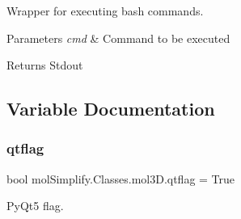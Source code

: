 Wrapper for executing bash commands. 


\begin{DoxyParams}{Parameters}
{\em cmd} & Command to be executed \\
\hline
\end{DoxyParams}
\begin{DoxyReturn}{Returns}
Stdout 
\end{DoxyReturn}


\subsection{Variable Documentation}
\mbox{\label{namespacemolSimplify_1_1Classes_1_1mol3D_a90f0c563b9ba5b490cd9884407a70c54}} 
\subsubsection{\texorpdfstring{qtflag}{qtflag}}
{\footnotesize\ttfamily bool mol\+Simplify.\+Classes.\+mol3\+D.\+qtflag = True}



Py\+Qt5 flag. 

